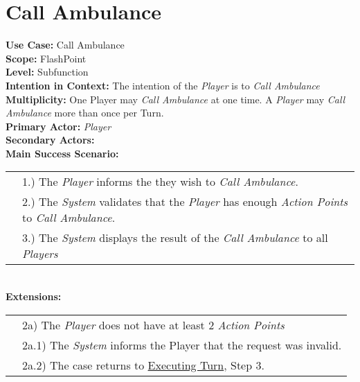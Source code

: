 \documentclass{article}
\begin{document}
	\section*{Call Ambulance}
	\textbf{Use Case:} Call Ambulance\\
	\textbf{Scope:} FlashPoint\\
	\textbf{Level:} Subfunction\\
	\textbf{Intention in Context:} The intention of the \textit{Player} is to \textit{Call Ambulance}\\
	\textbf{Multiplicity: } One Player may \textit{Call Ambulance} at one time. A \textit{Player} may \textit{Call Ambulance} more than once per Turn.\\
	\textbf{Primary Actor:} \textit{Player}\\
	\textbf{Secondary Actors:}\\
	\textbf{Main Success Scenario:}\\
	\begin{tabular}{l l}
		&1.) The \textit{Player} informs the \text{System} they wish to \textit{Call Ambulance}.\\
		&2.) The \textit{System} validates that the \textit{Player} has enough \textit{Action Points} to \textit{Call Ambulance}. \\
		&3.) The \textit{System} displays the result of the \textit{Call Ambulance} to all \textit{Players}
	\end{tabular}\\
	\textbf{Extensions: } \\
	\begin{tabular}{l l}
		&2a) The \textit{Player} does not have at least 2 \textit{Action Points} \\
		&\qquad2a.1) The \textit{System} informs the Player that the request was invalid. \\
		&\qquad2a.2) The case returns to \underline{Executing Turn}, Step 3.\\
	\end{tabular}
	
\end{document}
